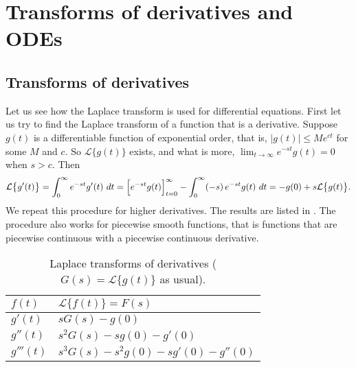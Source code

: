 
\sectionnewpage
\section{Transforms of derivatives and ODEs}
\label{transformsofders:section}


\subsection{Transforms of derivatives}

Let us see how the Laplace transform is used for differential equations.
First let us try to find the Laplace transform of a function that is a
derivative.  Suppose $g(t)$ is a differentiable function
of exponential order, that is, $\lvert g(t) \rvert \leq M e^{ct}$ for some
$M$ and $c$.  So $\mathcal{L} \bigl\{ g(t) \bigr\}$ exists, and what is more,
$\lim_{t\to\infty} e^{-st}g(t) = 0$ when $s > c$.  Then
\begin{equation*}
\mathcal{L} \bigl\{ g'(t) \bigr\}
=
\int_0^\infty
e^{-st}
g'(t) ~dt
=
\Bigl[e^{-st} g(t) \Bigr]_{t=0}^\infty
-
\int_0^\infty
(-s)\,
e^{-st}
g(t) ~dt
=
-g(0) + s \mathcal{L} \bigl\{ g(t) \bigr\} .
\end{equation*}
We repeat this procedure for higher derivatives.
The results are
listed in .  The procedure also works for piecewise
smooth functions, that is functions that are piecewise continuous with a
piecewise continuous derivative.

\begin{table}[h!t]
\mybeginframe
\capstart
\begin{center}
\begin{tabular}{@{}ll@{}}
\toprule
$f(t)$ & $\mathcal{L} \bigl\{ f(t) \bigr\} = F(s)$ \\
\midrule
$g'(t)$ & $sG(s)-g(0)$ \\[3pt]
$g''(t)$ & $s^2G(s)-sg(0)-g'(0)$ \\[3pt]
$g'''(t)$ & $s^3G(s)-s^2g(0)-sg'(0)-g''(0)$ \\
\bottomrule
\end{tabular}
\end{center}
\caption{Laplace transforms of derivatives
($G(s) = \mathcal{L} \bigl\{ g(t) \bigr\}$
as usual).\label{ltd:table}}
\myendframe
\end{table}

